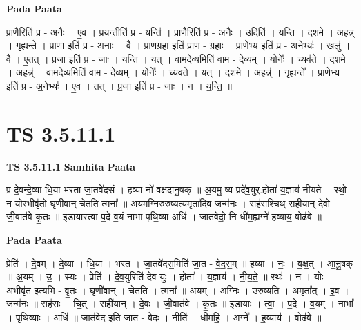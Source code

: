 \documentclass[17pt]{extarticle}
\begin{document}
\textbf{Pada Paata} \newline

प्रा॒णैरिति॑ प्र - अ॒नैः । ए॒व । प्र॒यन्तीति॑ प्र - यन्ति॑ । प्रा॒णैरिति॑ प्र - अ॒नैः । उदिति॑ । य॒न्ति॒ । द॒श॒मे । अहन्न्॑ । गृ॒ह्य॒न्ते॒ । प्रा॒णा इति॑ प्र - अ॒नाः । वै । प्रा॒ण॒ग्र॒हा इति॑ प्राण - ग्र॒हाः । प्रा॒णेभ्य॒ इति॑ प्र - अ॒नेभ्यः॑ । खलु॑ । वै । ए॒तत् । प्र॒जा इति॑ प्र - जाः । य॒न्ति॒ । यत् । वा॒म॒दे॒व्यमिति॑ वाम - दे॒व्यम् । योनेः᳚ । च्यव॑ते । द॒श॒मे । अहन्न्॑ । वा॒म॒दे॒व्यमिति॑ वाम - दे॒व्यम् । योनेः᳚ । च्य॒व॒ते॒ । यत् । द॒श॒मे । अहन्न्॑ । गृ॒ह्यन्ते᳚ । प्रा॒णेभ्य॒ इति॑ प्र - अ॒नेभ्यः॑ । ए॒व । तत् । प्र॒जा इति॑ प्र - जाः । न । य॒न्ति॒ ॥  \newline





\section{ TS 3.5.11.1 }

\textbf{TS 3.5.11.1 } \newline
\textbf{Samhita Paata} \newline

प्र दे॒वन्दे॒व्या धि॒या भर॑ता जा॒तवे॑दसं । ह॒व्या नो॑ वक्षदानु॒षक् ॥ अ॒यमु॒ ष्य प्रदे॑व॒युर्.होता॑ य॒ज्ञाय॑ नीयते । रथो॒ न योर॒भीवृ॑तो॒ घृणी॑वान् चेतति॒ त्मना᳚ ॥ अ॒यम॒ग्निरु॑रुष्यत्य॒मृता॑दिव॒ जन्म॑नः । सह॑सश्चि॒थ् सही॑यान् दे॒वो जी॒वात॑वे कृ॒तः ॥ इडा॑यास्त्वा प॒दे व॒यं नाभा॑ पृथि॒व्या अधि॑ । जात॑वेदो॒ नि धी॑म॒ह्यग्ने॑ ह॒व्याय॒ वोढ॑वे ॥ \newline

\textbf{Pada Paata} \newline

प्रेति॑ । दे॒वम् । दे॒व्या । धि॒या । भर॑त । जा॒तवे॑दस॒मिति॑ जा॒त - वे॒द॒स॒म् ॥ ह॒व्या । नः॒ । व॒क्ष॒त् । आ॒नु॒षक् ॥ अ॒यम् । उ॒ । स्यः । प्रेति॑ । दे॒व॒युरिति॑ देव-युः । होता᳚ । य॒ज्ञाय॑ । नी॒य॒ते॒ ॥ रथः॑ । न । योः । अ॒भीवृ॑त॒ इत्य॒भि - वृ॒तः॒ । घृणी॑वान् । चे॒त॒ति॒ । त्मना᳚ ॥ अ॒यम् । अ॒ग्निः । उ॒रु॒ष्य॒ति॒ । अ॒मृता᳚त् । इ॒व॒ । जन्म॑नः ॥ सह॑सः । चि॒त् । सही॑यान् । दे॒वः । जी॒वात॑वे । कृ॒तः ॥ इडा॑याः । त्वा॒ । प॒दे । व॒यम् । नाभा᳚ । पृ॒थि॒व्याः । अधि॑ ॥ जात॑वेद॒ इति॒ जात॑ - वे॒दः॒ । नीति॑ । धी॒म॒हि॒ । अग्ने᳚ । ह॒व्याय॑ । वोढ॑वे ॥  \newline




\end{document}
